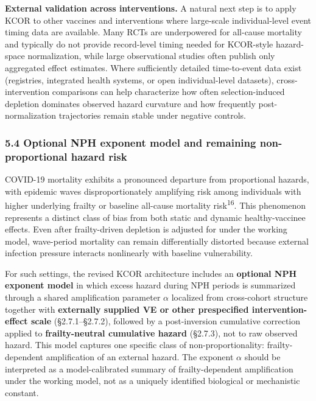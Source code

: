 \documentclass[
]{article}
\begin{document}
\textbf{External validation across interventions.} A natural next step
is to apply KCOR to other vaccines and interventions where large-scale
individual-level event timing data are available. Many RCTs are
underpowered for all-cause mortality and typically do not provide
record-level timing needed for KCOR-style hazard-space normalization,
while large observational studies often publish only aggregated effect
estimates. Where sufficiently detailed time-to-event data exist
(registries, integrated health systems, or open individual-level
datasets), cross-intervention comparisons can help characterize how
often selection-induced depletion dominates observed hazard curvature
and how frequently post-normalization trajectories remain stable under
negative controls.

\subsubsection{5.4 Optional NPH exponent model and remaining
non-proportional hazard
risk}\label{optional-nph-exponent-model-and-remaining-non-proportional-hazard-risk}

COVID-19 mortality exhibits a pronounced departure from proportional
hazards, with epidemic waves disproportionately amplifying risk among
individuals with higher underlying frailty or baseline all-cause
mortality risk\textsuperscript{16}. This phenomenon represents a
distinct class of bias from both static and dynamic healthy-vaccinee
effects. Even after frailty-driven depletion is adjusted for under the
working model, wave-period mortality can remain differentially distorted
because external infection pressure interacts nonlinearly with baseline
vulnerability.

For such settings, the revised KCOR architecture includes an
\textbf{optional NPH exponent model} in which excess hazard during NPH
periods is summarized through a shared amplification parameter
\(\alpha\) localized from cross-cohort structure together with
\textbf{externally supplied VE or other prespecified intervention-effect
scale} (§2.7.1--§2.7.2), followed by a post-inversion cumulative
correction applied to \textbf{frailty-neutral cumulative hazard}
(§2.7.3), not to raw observed hazard. This model captures one specific
class of non-proportionality: frailty-dependent amplification of an
external hazard. The exponent \(\alpha\) should be interpreted as a
model-calibrated summary of frailty-dependent amplification under the
working model, not as a uniquely identified biological or mechanistic
constant.
\end{document}
